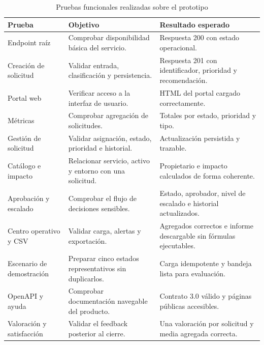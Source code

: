 \begin{table}[h]
\centering
\footnotesize
\begin{tabularx}{\textwidth}{l X X}
\textbf{Prueba} & \textbf{Objetivo} & \textbf{Resultado esperado} \\
\hline
Endpoint raíz & Comprobar disponibilidad básica del servicio. & Respuesta 200 con estado operacional. \\
Creación de solicitud & Validar entrada, clasificación y persistencia. & Respuesta 201 con identificador, prioridad y recomendación. \\
Portal web & Verificar acceso a la interfaz de usuario. & HTML del portal cargado correctamente. \\
Métricas & Comprobar agregación de solicitudes. & Totales por estado, prioridad y tipo. \\
Gestión de solicitud & Validar asignación, estado, prioridad e historial. & Actualización persistida y trazable. \\
Catálogo e impacto & Relacionar servicio, activo y entorno con una solicitud. & Propietario e impacto calculados de forma coherente. \\
Aprobación y escalado & Comprobar el flujo de decisiones sensibles. & Estado, aprobador, nivel de escalado e historial actualizados. \\
Centro operativo y CSV & Validar carga, alertas y exportación. & Agregados correctos e informe descargable sin fórmulas ejecutables. \\
Escenario de demostración & Preparar cinco estados representativos sin duplicarlos. & Carga idempotente y bandeja lista para evaluación. \\
OpenAPI y ayuda & Comprobar documentación navegable del producto. & Contrato 3.0 válido y páginas públicas accesibles. \\
Valoración y satisfacción & Validar el feedback posterior al cierre. & Una valoración por solicitud y media agregada correcta. \\
\end{tabularx}
\caption{Pruebas funcionales realizadas sobre el prototipo}
\label{tabla:pruebas_funcionales}
\end{table}

